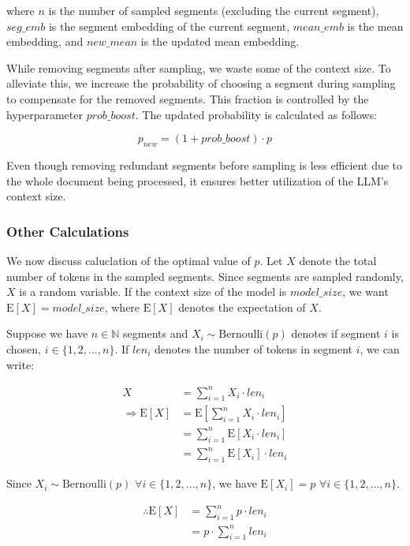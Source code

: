 \noindent where $n$ is the number of sampled segments (excluding the current segment),
$seg\_emb$ is the segment embedding of the current segment, $mean\_emb$ is the mean embedding, and $new\_mean$ is the updated mean embedding.

While removing segments after sampling, we waste some of the context size.
To alleviate this, we increase the probability of choosing a segment during sampling to compensate for the removed segments.
This fraction is controlled by the hyperparameter $prob\_boost$.
The updated probability is calculated as follows:

\[ p_{new} = (1 + prob\_boost) \cdot p \]

Even though removing redundant segments before sampling is less efficient due to the whole document being processed, it ensures better utilization of the LLM's context size.

\subsubsection*{Other Calculations}

We now discuss caluclation of the optimal value of $p$.
Let $X$ denote the total number of tokens in the sampled segments.
Since segments are sampled randomly, $X$ is a random variable.
If the context size of the model is $model\_size$, we want $\mathrm{E}[X] = model\_size$, where $\mathrm{E}[X]$ denotes the expectation of $X$.

Suppose we have $n \in \mathbb{N}$ segments and $X_i \sim \mathrm{Bernoulli}(p)$ denotes if segment $i$ is chosen, $i \in \{1, 2, \dots, n\}$.
If $len_i$ denotes the number of tokens in segment $i$, we can write:

\begin{align*}
  X &= \sum_{i = 1}^{n} X_i \cdot len_i \\
  \Rightarrow \mathrm{E}[X] &= \mathrm{E}[\sum_{i = 1}^{n} X_i \cdot len_i] \\
  &= \sum_{i = 1}^{n} \mathrm{E}[X_i \cdot len_i] \\
  &= \sum_{i = 1}^{n} \mathrm{E}[X_i] \cdot len_i
\end{align*}

Since $X_i \sim \mathrm{Bernoulli}(p)$ $\forall i \in \{1, 2, \dots, n\}$, we have $\mathrm{E}[X_i] = p$ $\forall i \in \{1, 2, \dots, n\}$.

\begin{align*}
  \therefore \mathrm{E}[X] &= \sum_{i = 1}^{n} p \cdot len_i \\
  &= p \cdot \sum_{i = 1}^{n} len_i
\end{align*}

